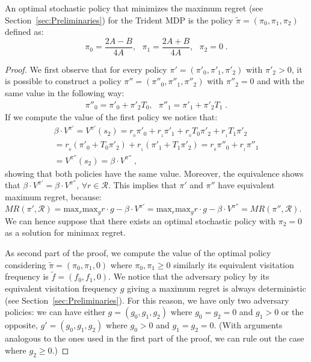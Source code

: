 \begin{proposition}\label{theorem:opt_stoc}
An optimal stochastic policy that minimizes the maximum regret (see Section~\ref{sec:Preliminaries}) for the Trident MDP is the policy $\tilde{\pi} = (\pi_0, \pi_1, \pi_2)$ defined as:
$$\pi_{0}=\dfrac{2A - B}{4A},~~~\pi_{1}=\dfrac{2A + B}{4A}, ~~~\pi_2 = 0\;.$$
\end{proposition}
\begin{proof}
We first observe that for every policy $\pi' = (\pi'_0, \pi'_1, \pi'_2)$ with $\pi'_2 > 0$, it is possible to construct a policy $\pi'' = (\pi''_0, \pi''_1, \pi''_2)$ with $\pi''_2 = 0$ and with the same value in the following way:
\begin{align*}
\pi''_0 = \pi'_0 + \pi'_2 T_0, ~~~ \pi''_1 = \pi'_1 + \pi'_2 T_1\;.
\end{align*}
If we compute the value of the first policy we notice that:
\begin{align*}
\beta \cdot V^{\pi'} = V^{\pi'}(s_2) =
r_{_0} \pi'_0 + r_{_1}\pi'_1 + r_{_0} T_0 \pi'_2 + r_{_1} T_1 \pi'_2 \\
= r_{_0} (\pi'_0 + T_0 \pi'_2) + r_{_1} (\pi'_1 + T_1 \pi'_2)
= r_{_0} \pi''_0 + r_{_1}\pi''_1  \\
= V^{\pi''}(s_2) =\beta \cdot V^{\pi''}\;,
\end{align*}
showing that both policies have the same value.
Moreover, the equivalence shows that  $\beta \cdot V^{\pi'}= \beta \cdot V^{\pi''}$, $\forall r \in \mathcal{R}$. This implies that
$\pi'$ and $\pi''$ have equivalent maximum regret, because: $MR(\pi', \mathcal{R}) = \text{max}_{r} \text{max}_g r \cdot g - \beta \cdot V^{\pi'} = \text{max}_{r} \text{max}_g r \cdot g - \beta \cdot V^{\pi''} = MR(\pi'', \mathcal{R})$.
We can hence suppose that there exists an optimal stochastic policy with $\pi_2 =0$ as a solution for minimax regret. 

As second part of the proof, we compute the value of the optimal policy considering $\tilde{\pi} = (\pi_0, \pi_1, 0)$ where $\pi_0, \pi_1 \geq 0$ similarly its equivalent visitation frequency is $\tilde{f} = (f_0, f_1, 0)$. 
We notice that the adversary policy by its equivalent visitation frequency $g$ giving a maximum regret is always deterministic (see Section~\ref{sec:Preliminaries}). For this reason, we have only two adversary policies: we can have either $g = (g_0, g_1, g_2)$ where $g_0 = g_2=0$ and $g_1 > 0$ or the opposite, $g' = (g_0, g_1, g_2)$ where $g_0>0$ and $g_1 = g_2 = 0$. (With arguments analogous to the ones used in the first part of the proof, we can rule out the case where $g_2 \geq 0$.)


\end{proof}
